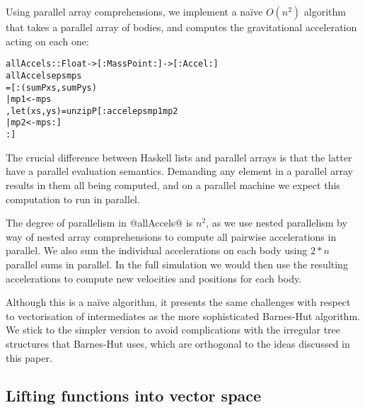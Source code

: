 Using parallel array comprehensions, we implement a na\"ive $O(n^2)$ algorithm that takes a parallel array of bodies, and computes the gravitational acceleration acting on each one:
%
\begin{small}
\begin{alltt}
  allAccels :: Float -> [:MassPoint:] -> [:Accel:]
  allAccels eps mps 
   = [: (sumP xs, sumP ys) 
      | mp1 <- mps
      , let (xs, ys) = unzipP [: accel eps mp1 mp2 
                     | mp2 <- mps :]    
      :]
\end{alltt}
\end{small}
%
The crucial difference between Haskell lists and parallel arrays is that the latter have a parallel evaluation semantics. Demanding any element in a parallel array results in them all being computed, and on a parallel machine we expect this computation to run in parallel.

The degree of parallelism in @allAccels@ is $n^2$, as we use nested parallelism by way of nested array comprehensions to compute all pairwise accelerations in parallel. We also sum the individual accelerations on each body using $2*n$ parallel sums in parallel. In the full simulation we would then use the resulting accelerations to compute new velocities and positions for each body. 

Although this is a na\"ive algorithm, it presents the same challenges with respect to vectorisation of intermediates as the more sophisticated \mbox{Barnes-Hut} algorithm. We stick to the simpler version to avoid complications with the irregular tree structures that \mbox{Barnes-Hut} uses, which are orthogonal to the ideas discussed in this paper.


\subsection{Lifting functions into vector space}
\label{Subsection:liftedFunctions}

